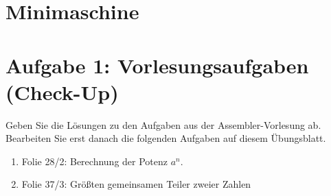 \documentclass{lehramt-informatik-aufgabe}
\begin{document}
\section{Minimaschine}

\section{Aufgabe 1: Vorlesungsaufgaben (Check-Up)}

Geben Sie die Lösungen zu den Aufgaben aus der Assembler-Vorlesung
ab. Bearbeiten Sie erst danach die folgenden Aufgaben auf diesem
Übungsblatt.

\begin{enumerate}


\item Folie 28/2: Berechnung der Potenz $a^n$.

\begin{multicols}{2}


\liSpaltenUmbruch
{}


\end{multicols}


\newpage

\item Folie 37/3: Größten gemeinsamen Teiler zweier Zahlen

\begin{multicols}{2}


\liSpaltenUmbruch
{}


\end{multicols}
\end{enumerate}
\end{document}
